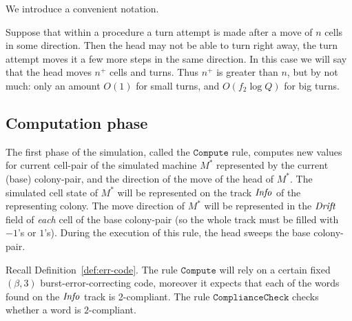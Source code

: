 \documentclass[11pt]{memoir}
\theoremstyle{definition} %
\newcommand{\fld}[1]{\ensuremath{\textit{#1\/}}}
\newcommand{\rul}[1]{\ensuremath{\texttt{#1}}}
\newcommand{\f}{f}
\newcommand{\Q}{Q}
\newcommand{\Drift}{\fld{Drift}}
\newcommand{\Info}{\fld{Info}}
\newcommand{\Comp}{\rul{Compute}}
\begin{document}

We introduce a convenient notation.
\begin{notation}\label{not:plus}
Suppose that within a procedure a turn attempt is made after a move of \( n \) cells in some direction.
Then the head may not be able to turn right away, the turn attempt moves it a few more steps in the same
direction.
In this case we will say that the head moves \( n^{+} \) cells and turns.
Thus \( n^{+} \) is greater than \( n \), but by not much: only an amount \( O(1) \)
for small turns, and \( O(\f_{2}\log \Q) \) for big turns.
\end{notation}

\subsection{Computation phase}\label{sec:computation-phase}

The first phase of the simulation, called the \( \Comp \) rule,
computes new values for current cell-pair of the
simulated machine \( M^{*} \) represented by the current (base) colony-pair,
and the direction of the move of the head of  \( M^{*} \).
The simulated cell state of \( M^{*} \) will be represented on the track \( \Info \) of the
representing colony.
The move direction of \( M^{*} \) 
will be represented in the \( \Drift \) field of \emph{each} cell of the base colony-pair
(so the whole track must be filled with \( -1 \)'s or \( 1 \)'s).
During the execution of this rule, the head sweeps the base colony-pair.

Recall Definition~\ref{def:err-code}.
The rule \( \Comp \) will rely on a certain fixed \( (\beta,3) \) burst-error-correcting
code, moreover
it expects that each of the words found on the \( \Info \) track
is 2-compliant.  %
The rule \( \rul{ComplianceCheck} \) checks whether a word is \( 2 \)-compliant.
\end{document}
